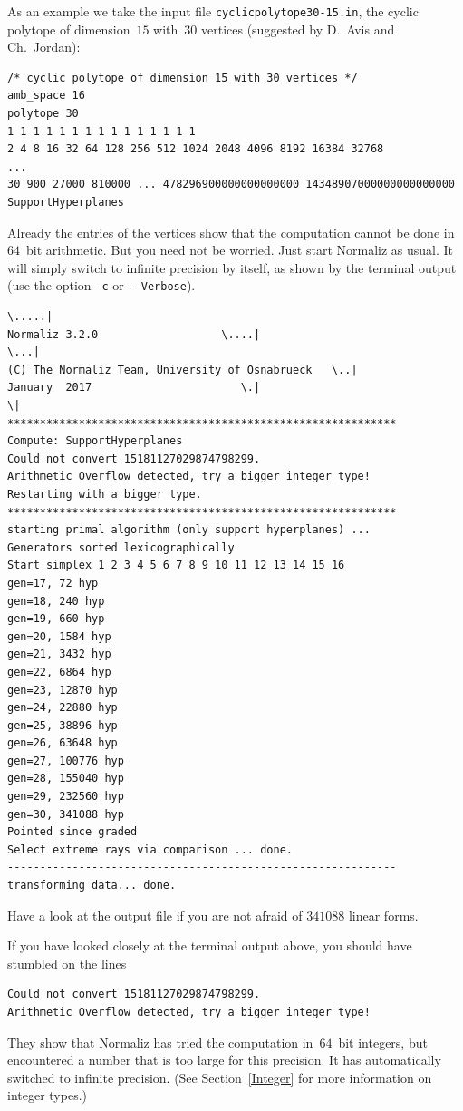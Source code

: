As an example we take the input file \verb|cyclicpolytope30-15.in|, the cyclic polytope of dimension~$15$ with~$30$ vertices (suggested by D.~Avis and Ch.~Jordan):
\begin{Verbatim}
/* cyclic polytope of dimension 15 with 30 vertices */
amb_space 16
polytope 30
1 1 1 1 1 1 1 1 1 1 1 1 1 1 1
2 4 8 16 32 64 128 256 512 1024 2048 4096 8192 16384 32768
...
30 900 27000 810000 ... 478296900000000000000 14348907000000000000000
SupportHyperplanes
\end{Verbatim}
Already the entries of the vertices show that the computation cannot be done in~$64$~bit arithmetic. But you need not be worried. Just start Normaliz as usual. It will simply switch to infinite precision by itself, as shown by the terminal output (use the option \verb|-c| or \verb|--Verbose|).
\begin{Verbatim}
\.....|
Normaliz 3.2.0                   \....|
\...|
(C) The Normaliz Team, University of Osnabrueck   \..|
January  2017                       \.|
\|
************************************************************
Compute: SupportHyperplanes
Could not convert 15181127029874798299.
Arithmetic Overflow detected, try a bigger integer type!
Restarting with a bigger type.
************************************************************
starting primal algorithm (only support hyperplanes) ...
Generators sorted lexicographically
Start simplex 1 2 3 4 5 6 7 8 9 10 11 12 13 14 15 16 
gen=17, 72 hyp
gen=18, 240 hyp
gen=19, 660 hyp
gen=20, 1584 hyp
gen=21, 3432 hyp
gen=22, 6864 hyp
gen=23, 12870 hyp
gen=24, 22880 hyp
gen=25, 38896 hyp
gen=26, 63648 hyp
gen=27, 100776 hyp
gen=28, 155040 hyp
gen=29, 232560 hyp
gen=30, 341088 hyp
Pointed since graded
Select extreme rays via comparison ... done.
------------------------------------------------------------
transforming data... done.
\end{Verbatim}
Have a look at the output file if you are not afraid of $341088$ linear forms.

If you have looked closely at the terminal output above, you should have stumbled on the lines
\begin{Verbatim}
Could not convert 15181127029874798299.
Arithmetic Overflow detected, try a bigger integer type!
\end{Verbatim}
They show that Normaliz has tried the computation in~$64$~bit integers, but encountered a number that is too large for this precision. It has automatically switched to infinite precision. (See Section~\ref{Integer} for more information on integer types.)

